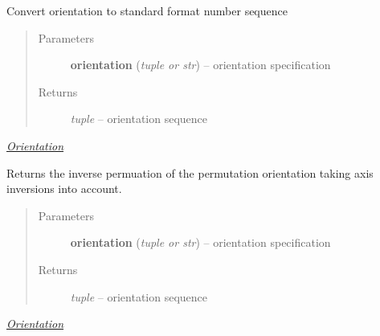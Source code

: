 \documentclass[letterpaper,10pt,english]{sphinxmanual}
\begin{document}
\begin{fulllineitems}
\label{api/ClearMap.Alignment:ClearMap.Alignment.Resampling.fixOrientation}
Convert orientation to standard format number sequence
\begin{quote}\begin{description}
\item[{Parameters}] \leavevmode
\textbf{orientation} (\emph{tuple or str}) --
orientation specification

\item[{Returns}] \leavevmode
\emph{tuple} --
orientation sequence

\end{description}\end{quote}




{\hyperref[api/ClearMap.Alignment:orientation]{\emph{Orientation}}}



\end{fulllineitems}


\begin{fulllineitems}
\label{api/ClearMap.Alignment:ClearMap.Alignment.Resampling.inverseOrientation}
Returns the inverse permuation of the permutation orientation taking axis inversions into account.
\begin{quote}\begin{description}
\item[{Parameters}] \leavevmode
\textbf{orientation} (\emph{tuple or str}) --
orientation specification

\item[{Returns}] \leavevmode
\emph{tuple} --
orientation sequence

\end{description}\end{quote}




{\hyperref[api/ClearMap.Alignment:orientation]{\emph{Orientation}}}



\end{fulllineitems}

\end{document}

